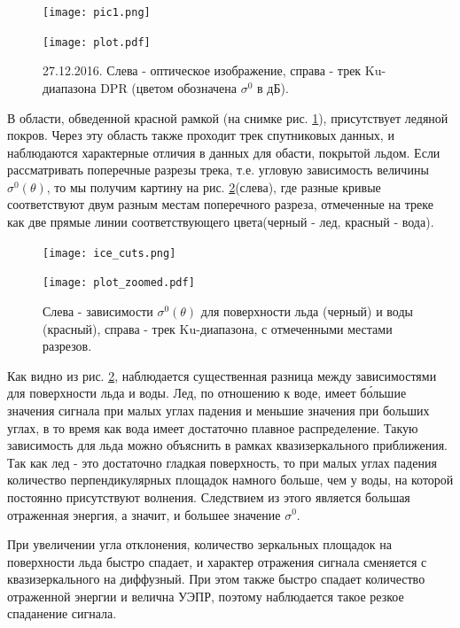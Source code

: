 \begin{figure}[h!]
  \centering
  \begin{minipage}{.49\linewidth}
    \texttt{[image: pic1.png]}
  \end{minipage}
  \begin{minipage}{.49\linewidth}
    \texttt{[image: plot.pdf]}
  \end{minipage}
  \caption{27.12.2016. Слева - оптическое изображение, справа - трек Ku-диапазона DPR (цветом обозначена $\sigma^0$ в дБ).}
  \label{fig:3}
\end{figure}

В области, обведенной красной рамкой (на снимке рис. \ref{fig:3}), присутствует ледяной покров. Через эту область также проходит трек
спутниковых данных, и наблюдаются характерные отличия в данных для обасти, покрытой льдом. Если рассматривать поперечные
разрезы трека, т.е. угловую зависимость величины $\sigma^0(\theta)$, то мы получим картину на рис. \ref{fig:4}(слева), где
разные кривые соответствуют двум разным местам поперечного разреза, отмеченные на треке как две прямые линии
соответствующего цвета(черный - лед, красный - вода).

\begin{figure}[h!]
  \centering
  \begin{minipage}{.49\linewidth}
    \texttt{[image: ice\_cuts.png]}
  \end{minipage}
  \begin{minipage}{.49\linewidth}
    \texttt{[image: plot\_zoomed.pdf]}
  \end{minipage}
  \caption{Слева - зависимости $\sigma^0(\theta)$ для поверхности льда (черный) и воды (красный), справа - трек Ku-диапазона, с отмеченными местами разрезов. }
  \label{fig:4}
\end{figure}

Как видно из рис. \ref{fig:4}, наблюдается существенная разница между зависимостями для поверхности льда и воды. Лед, по
отношению к воде, имеет б\'{о}льшие значения сигнала при малых углах падения и меньшие значения при больших углах, в то время как вода
имеет достаточно плавное распределение. Такую зависимость для льда можно объяснить в рамках
квазизеркального приближения. Так как лед - это достаточно гладкая поверхность, то при малых углах падения количество
перпендикулярных площадок намного больше, чем у воды, на которой постоянно присутствуют волнения. Следствием из этого
является большая отраженная энергия, а значит, и большее значение $\sigma^0$. 

При увеличении угла отклонения, количество зеркальных площадок на поверхности льда быстро спадает, и характер отражения сигнала
сменяется с квазизеркального на диффузный. При этом также быстро спадает количество отраженной энергии и велична УЭПР,
поэтому наблюдается такое резкое спаданение сигнала.


